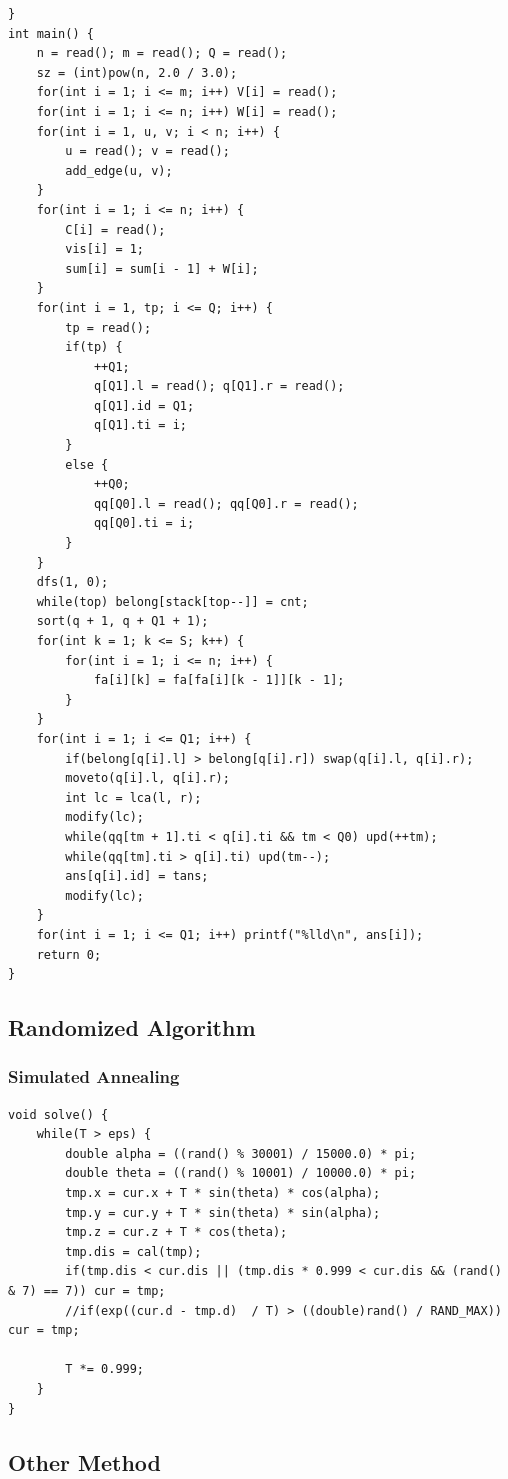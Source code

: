 \documentclass[10pt]{ctexart}
\begin{document}
{\begin{lstlisting}
}
int main() {
    n = read(); m = read(); Q = read();
    sz = (int)pow(n, 2.0 / 3.0);
    for(int i = 1; i <= m; i++) V[i] = read();
    for(int i = 1; i <= n; i++) W[i] = read();
    for(int i = 1, u, v; i < n; i++) {
        u = read(); v = read();
        add_edge(u, v);
    }
    for(int i = 1; i <= n; i++) {
        C[i] = read();
        vis[i] = 1;
        sum[i] = sum[i - 1] + W[i];
    }
    for(int i = 1, tp; i <= Q; i++) {
        tp = read(); 
        if(tp) {
            ++Q1;
            q[Q1].l = read(); q[Q1].r = read();
            q[Q1].id = Q1;
            q[Q1].ti = i;
        }
        else {
            ++Q0;
            qq[Q0].l = read(); qq[Q0].r = read();
            qq[Q0].ti = i;
        }
    }
    dfs(1, 0);
    while(top) belong[stack[top--]] = cnt;
    sort(q + 1, q + Q1 + 1);
    for(int k = 1; k <= S; k++) {
        for(int i = 1; i <= n; i++) {
            fa[i][k] = fa[fa[i][k - 1]][k - 1];
        }
    }
    for(int i = 1; i <= Q1; i++) {
        if(belong[q[i].l] > belong[q[i].r]) swap(q[i].l, q[i].r);
        moveto(q[i].l, q[i].r);
        int lc = lca(l, r);
        modify(lc);
        while(qq[tm + 1].ti < q[i].ti && tm < Q0) upd(++tm);
        while(qq[tm].ti > q[i].ti) upd(tm--);
        ans[q[i].id] = tans;
        modify(lc);
    }
    for(int i = 1; i <= Q1; i++) printf("%lld\n", ans[i]);
    return 0;
}
\end{lstlisting}
\subsection{Randomized Algorithm}
\subsubsection{Simulated Annealing}
\begin{lstlisting}
void solve() {
    while(T > eps) {
        double alpha = ((rand() % 30001) / 15000.0) * pi;
        double theta = ((rand() % 10001) / 10000.0) * pi;
        tmp.x = cur.x + T * sin(theta) * cos(alpha);
        tmp.y = cur.y + T * sin(theta) * sin(alpha);
        tmp.z = cur.z + T * cos(theta);
        tmp.dis = cal(tmp);
        if(tmp.dis < cur.dis || (tmp.dis * 0.999 < cur.dis && (rand() & 7) == 7)) cur = tmp;
        //if(exp((cur.d - tmp.d)  / T) > ((double)rand() / RAND_MAX)) cur = tmp;

        T *= 0.999;
    }
}
\end{lstlisting}
\subsection{Other Method}
}
\end{document}
